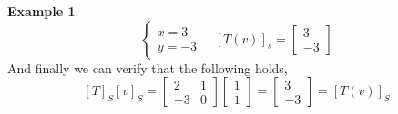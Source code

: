 \documentclass{report}
\theoremstyle{definition}
\newtheorem{ex}{Example}[section]
\theoremstyle{remark}
\begin{document}
\begin{ex}
\[\left\lbrace\begin{array}{l}
x=3\\
y=-3
\end{array}\right.\quad
[T(v)]_s=\begin{bmatrix}
3 \\ -3
\end{bmatrix}
\]
And finally we can verify that the following holds,
\[
[T]_S[v]_S=
\begin{bmatrix}
2 & 1 \\ -3 & 0
\end{bmatrix}
\begin{bmatrix}
1 \\ 1
\end{bmatrix}=
\begin{bmatrix}
3 \\ -3
\end{bmatrix}=
[T(v)]_S
\]
\end{ex}
\end{document}
